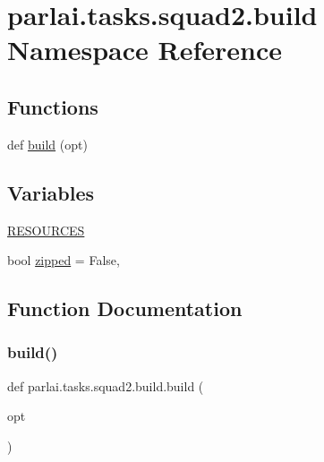 \hypertarget{namespaceparlai_1_1tasks_1_1squad2_1_1build}{}\section{parlai.\+tasks.\+squad2.\+build Namespace Reference}
\label{namespaceparlai_1_1tasks_1_1squad2_1_1build}
\subsection*{Functions}
\begin{DoxyCompactItemize}
\item 
def \hyperlink{namespaceparlai_1_1tasks_1_1squad2_1_1build_ac3bace71a0761323718dcde114b169d7}{build} (opt)
\end{DoxyCompactItemize}
\subsection*{Variables}
\begin{DoxyCompactItemize}
\item 
\hyperlink{namespaceparlai_1_1tasks_1_1squad2_1_1build_a7ec1a941e12afae17dd74dc22fd2538e}{R\+E\+S\+O\+U\+R\+C\+ES}
\item 
bool \hyperlink{namespaceparlai_1_1tasks_1_1squad2_1_1build_afd71a1a5972c8d7c6a601b21b0629164}{zipped} = False,
\end{DoxyCompactItemize}


\subsection{Function Documentation}
\mbox{\label{namespaceparlai_1_1tasks_1_1squad2_1_1build_ac3bace71a0761323718dcde114b169d7}} 
\subsubsection{\texorpdfstring{build()}{build()}}
{\footnotesize\ttfamily def parlai.\+tasks.\+squad2.\+build.\+build (\begin{DoxyParamCaption}\item[{}]{opt }\end{DoxyParamCaption})}




